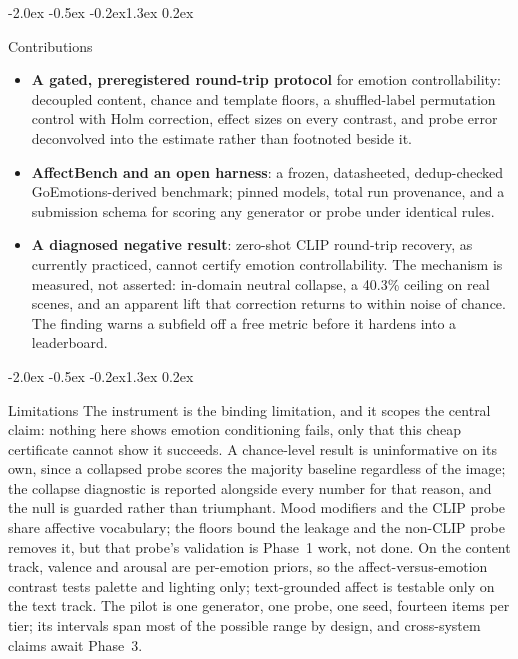 \documentclass[10pt]{article}
\makeatletter
\renewcommand\section{\@startsection{section}{1}{\z@}%
  {-2.0ex \@plus -0.5ex \@minus -0.2ex}{1.3ex \@plus 0.2ex}{\large\bfseries\raggedright}}
\makeatother
\begin{document}
\section{Contributions}
\begin{itemize}\itemsep1pt
\item \textbf{A gated, preregistered round-trip protocol} for emotion controllability: decoupled content, chance and template floors, a shuffled-label permutation control with Holm correction, effect sizes on every contrast, and probe error deconvolved into the estimate rather than footnoted beside it.
\item \textbf{AffectBench and an open harness}: a frozen, datasheeted, dedup-checked GoEmotions-derived benchmark; pinned models, total run provenance, and a submission schema for scoring any generator or probe under identical rules.
\item \textbf{A diagnosed negative result}: zero-shot CLIP round-trip recovery, as currently practiced, cannot certify emotion controllability. The mechanism is measured, not asserted: in-domain neutral collapse, a 40.3\% ceiling on real scenes, and an apparent lift that correction returns to within noise of chance. The finding warns a subfield off a free metric before it hardens into a leaderboard.
\end{itemize}

\section{Limitations}
The instrument is the binding limitation, and it scopes the central claim: nothing here shows emotion conditioning fails, only that this cheap certificate cannot show it succeeds. A chance-level result is uninformative on its own, since a collapsed probe scores the majority baseline regardless of the image; the collapse diagnostic is reported alongside every number for that reason, and the null is guarded rather than triumphant. Mood modifiers and the CLIP probe share affective vocabulary; the floors bound the leakage and the non-CLIP probe removes it, but that probe's validation is Phase~1 work, not done. On the content track, valence and arousal are per-emotion priors, so the affect-versus-emotion contrast tests palette and lighting only; text-grounded affect is testable only on the text track. The pilot is one generator, one probe, one seed, fourteen items per tier; its intervals span most of the possible range by design, and cross-system claims await Phase~3.
\end{document}
